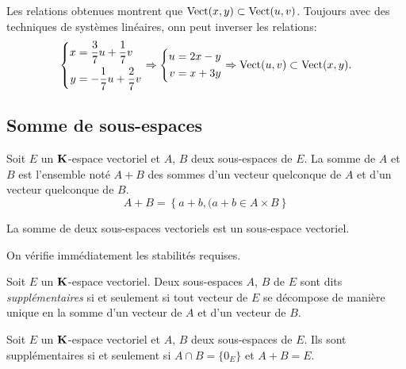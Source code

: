 Les relations obtenues montrent que $\mathop{\mathrm{Vect}}(x,y) \subset \mathop{\mathrm{Vect}}(u,v)$. Toujours avec des techniques de systèmes linéaires, onn peut inverser les relations:
\begin{displaymath}
 \left\lbrace 
\begin{aligned}
 x&= \frac{3}{7}u + \frac{1}{7}v \\ y &= -\frac{1}{7}u + \frac{2}{7}v
\end{aligned}
\right. 
\Rightarrow
 \left\lbrace 
\begin{aligned}
 u&= 2x -y \\ v &= x+3y
\end{aligned}
\right. 
\Rightarrow \mathop{\mathrm{Vect}}(u,v) \subset \mathop{\mathrm{Vect}}(x,y).
\end{displaymath}

\subsection{Somme de sous-espaces}
\begin{defi}
 Soit $E$ un $\mathbf{K}$-espace vectoriel et $A$, $B$ deux sous-espaces de $E$. La somme de $A$ et $B$ est l'ensemble noté $A+B$ des sommes d'un vecteur quelconque de $A$ et d'un vecteur quelconque de $B$.
\begin{displaymath}
 A+B = \left\lbrace a+b, (a+b\in A\times B\right\rbrace 
\end{displaymath}
\end{defi}
\begin{prop}
 La somme de deux sous-espaces vectoriels est un sous-espace vectoriel.
\end{prop}
\begin{demo}
 On vérifie immédiatement les stabilités requises.
\end{demo}
\begin{defi}
 Soit $E$ un $\mathbf{K}$-espace vectoriel. Deux sous-espaces $A$, $B$ de $E$ sont dits \emph{supplémentaires} si et seulement si tout vecteur de $E$ se décompose de manière unique en la somme d'un vecteur de $A$ et d'un vecteur de $B$.
\end{defi}
\begin{prop}
 Soit $E$ un $\mathbf{K}$-espace vectoriel et $A$, $B$ deux sous-espaces de $E$. Ils sont supplémentaires si et seulement si $A\cap B=\{0_E\}$ et $A+B=E$.
\end{prop}
